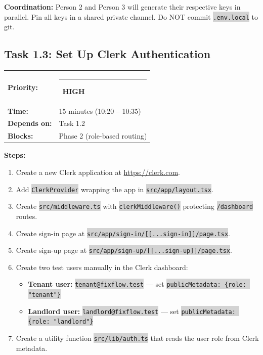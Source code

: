 \documentclass[11pt, a4paper]{article}
\newcommand{\highpri}{\textcolor{highamber}{\rule{6pt}{6pt}}~\textcolor{highamber}{\scriptsize\textbf{HIGH}}}
\newcommand{\code}[1]{\texttt{\small\colorbox{lightgray}{#1}}}
\begin{document}
\begin{warningbox}
\textbf{Coordination:} Person 2 and Person 3 will generate their respective keys in parallel. Pin all keys in a shared private channel. Do NOT commit \code{.env.local} to git.
\end{warningbox}

\vspace{1em}

\subsection{Task 1.3: Set Up Clerk Authentication}

\begin{tabularx}{\textwidth}{lX}
\textbf{Priority:} & \highpri \\
\textbf{Time:} & 15 minutes (10:20 -- 10:35) \\
\textbf{Depends on:} & Task 1.2 \\
\textbf{Blocks:} & Phase 2 (role-based routing) \\
\end{tabularx}

\vspace{0.3em}

\textbf{Steps:}
\begin{enumerate}[leftmargin=2em, itemsep=2pt]
  \item Create a new Clerk application at \url{https://clerk.com}.
  \item Add \code{ClerkProvider} wrapping the app in \code{src/app/layout.tsx}.
  \item Create \code{src/middleware.ts} with \code{clerkMiddleware()} protecting \code{/dashboard} routes.
  \item Create sign-in page at \code{src/app/sign-in/[[...sign-in]]/page.tsx}.
  \item Create sign-up page at \code{src/app/sign-up/[[...sign-up]]/page.tsx}.
  \item Create two test users manually in the Clerk dashboard:
    \begin{itemize}[itemsep=1pt]
      \item \textbf{Tenant user:} \code{tenant@fixflow.test} --- set \code{publicMetadata: \{role: "tenant"\}}
      \item \textbf{Landlord user:} \code{landlord@fixflow.test} --- set \code{publicMetadata: \{role: "landlord"\}}
    \end{itemize}
  \item Create a utility function \code{src/lib/auth.ts} that reads the user role from Clerk metadata.
\end{enumerate}
\end{document}
